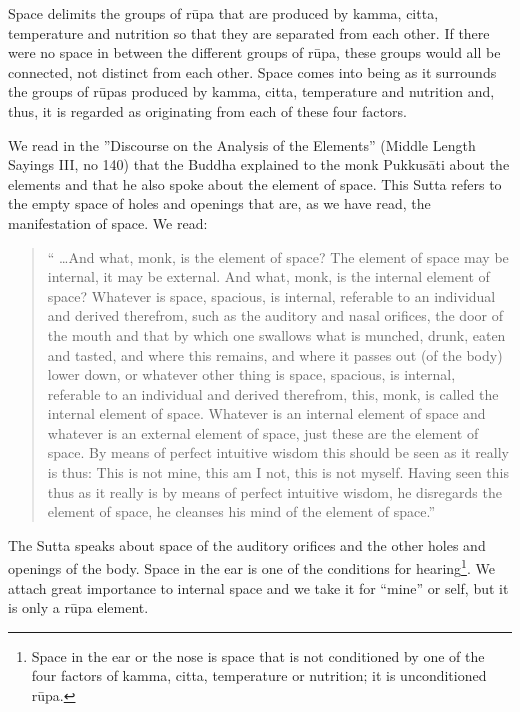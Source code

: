 \documentclass{book}
\begin{document}
Space delimits the groups of r\=upa that are produced by kamma, citta,
temperature and nutrition so that they are separated from each other.
If there were no space in between the different groups of r\=upa, these
groups would all be connected, not distinct from each other. Space
comes into being as it surrounds the groups of r\=upas produced by
kamma, citta, temperature and nutrition and, thus, it is regarded as
originating from each of these four factors. 

We read in the ''Discourse on the Analysis of the Elements'' (Middle
Length Sayings III, no 140) that the Buddha explained to the monk
Pukkus{\=a}ti about the elements and that he also spoke about the
element of space. This Sutta refers to the empty space of holes and
openings that are, as we have read, the manifestation of space. We
read:




\begin{quote}\begin{flushleft}
`` \ldots And what, monk, is the element of space? The element of space may
be internal, it may be external. And what, monk, is the internal
element of space? Whatever is space, spacious, is internal, referable
to an individual and derived therefrom, such as the auditory and nasal
orifices, the door of the mouth and that by which one swallows what is
munched, drunk, eaten and tasted, and where this remains, and where it
passes out (of the body) lower down, or whatever other thing is space,
spacious, is internal, referable to an individual and derived
therefrom, this, monk, is called the internal element of space.
Whatever is an internal element of space and whatever is an external
element of space, just these are the element of space. By means of
perfect intuitive wisdom this should be seen as it really is thus: This
is not mine, this am I not, this is not myself. Having seen this thus
as it really is by means of perfect intuitive wisdom, he disregards the
element of space, he cleanses his mind of the element of space.''

\end{flushleft}\end{quote}

The Sutta speaks about space of the auditory orifices and the other holes and openings of the body. Space in the ear is one of the conditions for hearing\footnote{Space in the ear or the nose is space that is not conditioned by one of the four factors of kamma, citta, temperature or nutrition; it is unconditioned r\=upa.}. We attach great importance to internal space and we take it for ``mine'' or self, but it is only a r\=upa element.
\end{document}
